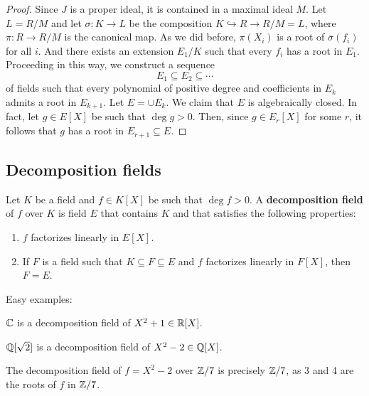 \begin{proof}
    Since $J$ is a proper ideal, it is contained in a maximal ideal $M$. Let $L=R/M$ 
    and let $\sigma\colon K\to L$ be the composition $K\hookrightarrow R\to R/M=L$, 
    where $\pi\colon R\to R/M$ is the canonical map.  
    As we did before,
    $\pi(X_i)$ is a root of $\overline{\sigma}(f_i)$ for all $i$. And 
    there exists an extension $E_1/K$ such that
    every $f_i$ has a root in $E_1$. Proceeding in this way, we construct
    a sequence
    \[
    E_1\subseteq E_2\subseteq\cdots
    \]
    of fields such that every polynomial of positive degree and coefficients in $E_k$ 
    admits a root in $E_{k+1}$. Let $E=\cup E_k$. We claim that $E$ is algebraically closed. In fact, 
    let $g\in E[X]$ be such that $\deg g>0$. Then, since $g\in E_r[X]$ for some $r$, it follows
    that $g$ has a root in $E_{r+1}\subseteq E$. 
\end{proof}

\subsection{Decomposition fields}

\begin{definition}
	Let $K$ be a field and $f\in K[X]$ be such that $\deg f>0$. A \textbf{decomposition field}
	of $f$ over $K$ is field $E$ that contains $K$ and that satisfies the following properties:
	\begin{enumerate}
		\item $f$ factorizes linearly in $E[X]$. 
		\item If $F$ is a field such that $K\subseteq F\subseteq E$ and 
			$f$ factorizes
			linearly in $F[X]$, then $F=E$. 
	\end{enumerate}
\end{definition}

Easy examples: 

\begin{example}
	$\mathbb{C}$ is a decomposition field of $X^2+1\in\mathbb{R}[X]$. 
\end{example}

\begin{example}
	$\mathbb{Q}[\sqrt{2}]$ is a decomposition field of $X^2-2\in\mathbb{Q}[X]$. 
\end{example}

\begin{example}
    The decomposition field of $f=X^2-2$ over $\mathbb{Z}/7$ is 
    precisely $\mathbb{Z}/7$, as 3 and 4 are the roots of $f$ in $\mathbb{Z}/7$. 
\end{example}


